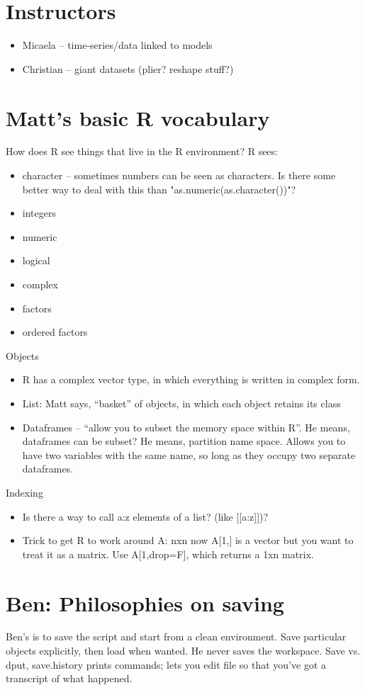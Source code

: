 \documentclass{article}
\begin{document}
\section*{Instructors}
  \begin{itemize}
    \item Micaela -- time-series/data linked to models
    \item Christian -- giant datasets (plier? reshape stuff?)
  \end{itemize}
  
\section*{Matt's basic R vocabulary}
How does R see things that live in the R environment? R sees:
\begin{itemize}
  \item character -- sometimes numbers can be seen as characters.  Is there some better way to deal with this than "as.numeric(as.character())"?
  \item integers
  \item numeric
  \item logical
  \item complex
  \item factors
  \item ordered factors
\end{itemize}

Objects 
\begin{itemize}
  \item R has a complex vector type, in which everything is written in complex form. 
  \item List: Matt says, ``basket'' of objects, in which each object retains its class
  \item Dataframes -- ``allow you to subset the memory space within R''.  He means, dataframes can be subset?  He means, partition name space. Allows you to have two variables with the same name, so long as they occupy two separate dataframes. 
\end{itemize}

Indexing
\begin{itemize}
  \item Is there a way to call a:z elements of a list? (like [[a:z]])?
  \item Trick to get R to work around A: nxn now A[1,] is a vector but you want to treat it as a matrix.  Use A[1,drop=F], which returns a 1xn matrix. 
\end{itemize}

\section*{Ben: Philosophies on saving}
Ben's is to save the script and start from a clean environment.  Save particular objects explicitly, then load when wanted.  He never saves the workspace.  Save vs. dput, save.history prints commands; lets you edit file so that you've got a transcript of what happened.
\end{document}
